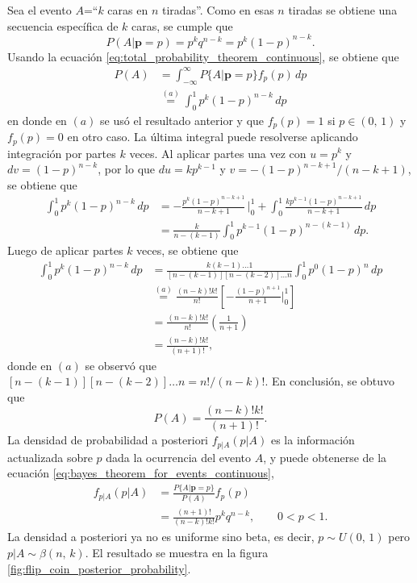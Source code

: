 \documentclass[a4paper]{report}
\newcommand{\p}{\mathbf{p}}
\begin{document}
Sea el evento \(A\)=``\(k\) caras en \(n\) tiradas''. Como en esas \(n\) tiradas se obtiene una secuencia específica de \(k\) caras, se cumple que
\[
 P(A|\p=p)=p^kq^{n-k}=p^k(1-p)^{n-k}.
\]
Usando la ecuación \ref{eq:total_probability_theorem_continuous}, se obtiene que
\begin{align*}
 P(A) &= \int_{-\infty}^{\infty}P\{A|\p = p\}f_p(p)\,dp\\
      &\overset{(a)}{=} \int_{0}^{1}p^k(1-p)^{n-k}\,dp
\end{align*}
en donde en \((a)\) se usó el resultado anterior y que \(f_p(p)=1\) si \(p\in(0,\,1)\) y \(f_p(p)=0\) en otro caso. La última integral puede resolverse aplicando integración por partes \(k\) veces. Al aplicar partes una vez con \(u=p^k\) y \(dv=(1-p)^{n-k}\), por lo que \(du=kp^{k-1}\) y \(v=-(1-p)^{n-k+1}/(n-k+1)\), se obtiene que
\begin{align*}
 \int_{0}^{1}p^k(1-p)^{n-k}\,dp&=-\frac{p^{k}(1-p)^{n-k+1}}{n-k+1}\,\bigg|_{0}^{1} + \int_{0}^{1}\frac{kp^{k-1}(1-p)^{n-k+1}}{n-k+1}\,dp\\
 &=\frac{k}{n-(k-1)}\int_{0}^{1}p^{k-1}(1-p)^{n-(k-1)}\,dp.
\end{align*}
Luego de aplicar partes \(k\) veces, se obtiene que
\begin{align*}
 \int_{0}^{1}p^k(1-p)^{n-k}\,dp&=\frac{k(k-1)\dots 1}{[n-(k-1)][n-(k-2)]\dots n} \int_{0}^{1}p^0(1-p)^{n}\,dp\\
  &\overset{(a)}{=}\frac{(n-k)!k!}{n!}\left[-\frac{(1-p)^{n+1}}{n+1}\bigg|_{0}^{1}\right]\\
  &=\frac{(n-k)!k!}{n!}\left(\frac{1}{n+1}\right)\\
  &=\frac{(n-k)!k!}{(n+1)!},
\end{align*}
donde en \((a)\) se observó que \([n-(k-1)][n-(k-2)]\dots n=n!/(n-k)!\). En conclusión, se obtuvo que
\[
 P(A)=\frac{(n-k)!k!}{(n+1)!}.
\]
La densidad de probabilidad a posteriori \(f_{p|A}(p|A)\) es la información actualizada sobre \(p\) dada la ocurrencia del evento \(A\), y puede obtenerse de la ecuación \ref{eq:bayes_theorem_for_events_continuous},
\begin{align*}
 f_{p|A}(p|A)&=\frac{P\{A|\p = p\}}{P(A)}f_p(p)\\
   &=\frac{(n+1)!}{(n-k)!k!}p^kq^{n-k},\qquad 0<p<1.
\end{align*}
La densidad a posteriori ya no es uniforme sino beta, es decir, \(p\sim U(0,\,1)\) pero \(p|A\sim \beta(n,\,k)\). El resultado se muestra en la figura \ref{fig:flip_coin_posterior_probability}.
\end{document}

